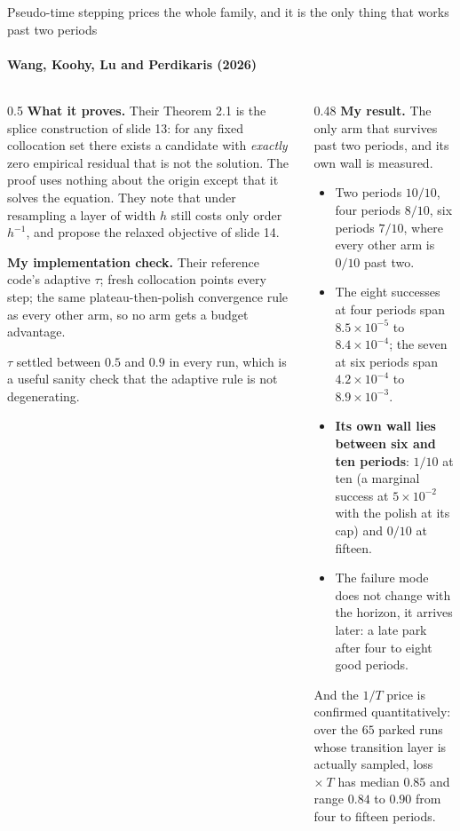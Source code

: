 \documentclass[aspectratio=169,10pt]{beamer}
\newcommand{\hl}[1]{{\color{accent}\textbf{#1}}}
\newcommand{\bad}[1]{{\color{warm}\textbf{#1}}}
\begin{document}
\begin{frame}[shrink=25]{Pseudo-time stepping prices the whole family, and it is the only thing that works past two periods}
  \framesubtitle{Wang, Koohy, Lu and Perdikaris (2026)}
  \vspace{1mm}
  \begin{columns}[T]
    \begin{column}{0.5\textwidth}
      \textbf{What it proves.} Their Theorem 2.1 is the splice construction of
      slide 13: for any fixed collocation set there exists a candidate with
      \emph{exactly} zero empirical residual that is not the solution. The proof
      uses nothing about the origin except that it solves the equation. They
      note that under resampling a layer of width $h$ still costs only order
      $h^{-1}$, and propose the relaxed objective of slide 14.
      \medskip

      \textbf{My implementation check.} Their reference code's adaptive $\tau$;
      fresh collocation points every step; the same plateau-then-polish
      convergence rule as every other arm, so no arm gets a budget advantage.
      \medskip

      {\small $\tau$ settled between $0.5$ and $0.9$ in every run, which is a
       useful sanity check that the adaptive rule is not degenerating.}
    \end{column}
    \begin{column}{0.48\textwidth}
      \textbf{My result.} The only arm that survives past two periods, and its
      own wall is measured.
      \begin{itemize}\small
        \item Two periods $10/10$, four periods \hl{$8/10$}, six periods
              \hl{$7/10$}, where every other arm is $0/10$ past two.
        \item The eight successes at four periods span $8.5\times10^{-5}$ to
              $8.4\times10^{-4}$; the seven at six periods span
              $4.2\times10^{-4}$ to $8.9\times10^{-3}$.
        \item \bad{Its own wall lies between six and ten periods}: $1/10$ at
              ten (a marginal success at $5\times10^{-2}$ with the polish at its
              cap) and $0/10$ at fifteen.
        \item The failure mode does not change with the horizon, it arrives
              later: a late park after four to eight good periods.
      \end{itemize}
      \smallskip
      {\small And the $1/T$ price is confirmed quantitatively: over the $65$
       parked runs whose transition layer is actually sampled, loss $\times\ T$
       has median $0.85$ and range $0.84$ to $0.90$ from four to fifteen
       periods.}
    \end{column}
  \end{columns}
\end{frame}
\end{document}
